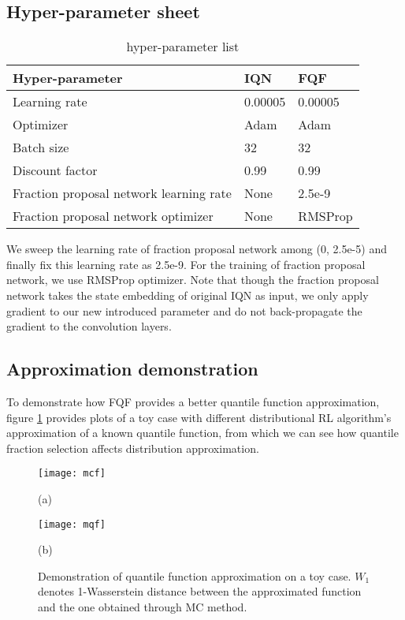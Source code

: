 \documentclass{article}
\begin{document}
\subsection*{Hyper-parameter sheet}
\begin{table*}[ht]
	\centering
    \begin{tabular}{l|l|l}
Hyper-parameter & IQN & FQF \\ \hline
Learning rate & 0.00005 & 0.00005 \\
Optimizer & Adam & Adam \\
Batch size & 32 & 32 \\
Discount factor & 0.99 & 0.99 \\
Fraction proposal network learning rate & None & 2.5e-9 \\
Fraction proposal network optimizer & None & RMSProp \\
	\end{tabular}
\caption{hyper-parameter list}  \label{hyperparameter}
\end{table*}
We sweep the learning rate of fraction proposal network among (0, 2.5e-5) and finally fix this learning rate as 2.5e-9. For the training of fraction proposal network, we use RMSProp optimizer. Note that though the fraction proposal network takes the state embedding of original IQN as input, we only apply gradient to our new introduced parameter and do not back-propagate the gradient to the convolution layers.

\subsection*{Approximation demonstration}
To demonstrate how FQF provides a better quantile function approximation, figure \ref{fig:toy} provides plots of a toy case with different distributional RL algorithm's approximation of a known quantile function, from which we can see how quantile fraction selection affects distribution approximation.

\begin{figure}[!htb]
   \begin{minipage}{0.48\textwidth}
     \centering
     \texttt{[image: mcf]}
     \caption*{(a)}
   \end{minipage}\hfill
   \begin{minipage}{0.48\textwidth}
     \centering
     \texttt{[image: mqf]}
     \caption*{(b)}
   \end{minipage}
   \caption{Demonstration of quantile function approximation on a toy case. $W_1$ denotes 1-Wasserstein distance between the approximated function and the one obtained through MC method.}
   \label{fig:toy}
\end{figure}
\end{document}
